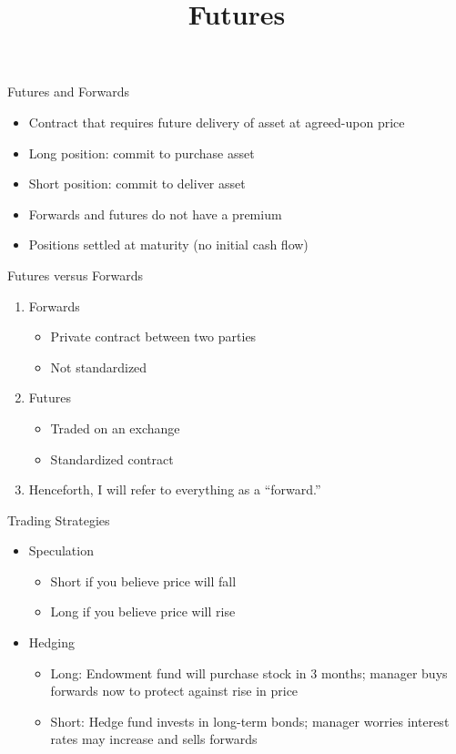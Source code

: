 \documentclass{beamer}
\title{Futures}
\begin{document}
\begin{frame}{Futures and Forwards}
\begin{itemize}
    \item Contract that requires future delivery of asset at agreed-upon price
    \item Long position: commit to purchase asset
    \item Short position: commit to deliver asset
    \item Forwards and futures do not have a premium
    \item Positions settled at maturity (no initial cash flow)
\end{itemize}
\end{frame}


\begin{frame}{Futures versus Forwards}
\begin{enumerate}
    \item Forwards
        \begin{itemize}
            \item Private contract between two parties 
            \item Not standardized
        \end{itemize}
    \item Futures \\
        \begin{itemize}
            \item Traded on an exchange
            \item Standardized contract 
        \end{itemize}
    \item Henceforth, I will refer to everything as a ``forward.''
\end{enumerate}
\end{frame}

\begin{frame}{Trading Strategies}
    \begin{itemize}
        \item Speculation
            \begin{itemize}
                \item Short if you believe price will fall
                \item Long if you believe price will rise
            \end{itemize}
        \item Hedging
            \begin{itemize}
                \item Long: Endowment fund will purchase stock in 3 months; manager buys forwards now to protect against rise in price
                \item Short: Hedge fund invests in long-term bonds; manager worries interest rates may increase and sells forwards
            \end{itemize}
    \end{itemize}
\end{frame}
\end{document}
